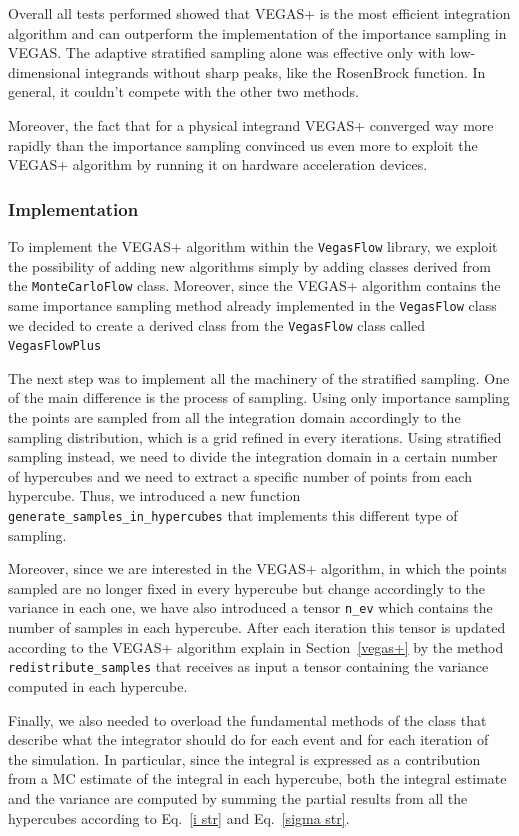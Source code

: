 \documentclass[../main/main.tex]{subfiles}
\begin{document}
Overall all tests performed showed that VEGAS+ is  the most efficient integration algorithm and can outperform the implementation of the importance sampling in VEGAS. The adaptive stratified sampling alone was effective only with low-dimensional integrands without sharp peaks, like the RosenBrock function. In general, it couldn't compete with the other two methods.

Moreover, the fact that for a physical integrand VEGAS+ converged way more rapidly than the importance sampling convinced us even more to exploit the VEGAS+ algorithm by running it on hardware acceleration devices.


\subsubsection{Implementation}
To implement the VEGAS+ algorithm within the \texttt{VegasFlow} library, we exploit the possibility of adding new algorithms simply by
adding classes derived from the \texttt{MonteCarloFlow} class. Moreover, since the VEGAS+ algorithm contains the same importance sampling method already implemented in the \texttt{VegasFlow} class we decided to create a derived class from the \texttt{VegasFlow} class called \texttt{VegasFlowPlus}

The next step was to implement all the machinery of the stratified sampling. 
One of the main difference is the process of sampling. Using only importance sampling the points are sampled from all the integration domain accordingly to the sampling distribution, which is a grid refined in every iterations. Using stratified sampling instead, we need to divide the integration domain in a certain number of hypercubes and we need to extract a specific number of points from each hypercube. 
Thus, we introduced a new function \texttt{generate\_samples\_in\_hypercubes} that implements this different type of sampling.

Moreover, since we are interested in the VEGAS+ algorithm, in which the points sampled are no longer fixed in every hypercube but change accordingly to the variance in each one, we have also introduced a tensor \texttt{n\_ev} which contains the number of samples in each hypercube. 
After each iteration this tensor is updated according to the VEGAS+ algorithm explain in Section~\ref{vegas+} by the method \texttt{redistribute\_samples} that receives as input a tensor containing the variance computed in each hypercube.

Finally, we also needed to overload the fundamental methods of the class that describe what the integrator should do for each event and for each iteration of the simulation. In particular, since the integral is expressed as a contribution from a MC estimate of the integral in each hypercube, both the integral estimate and the variance are computed by summing the partial results from all the hypercubes according to Eq.~\ref{i str} and Eq.~\ref{sigma str}.
\end{document}
